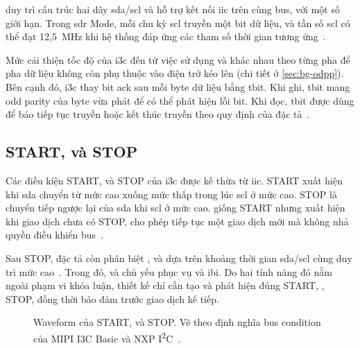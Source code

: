 \MIPIIThreeCBasic{} duy trì cấu trúc hai dây \gls{sda}/\gls{scl} và hỗ trợ kết nối \Target{} \gls{iic} trên cùng bus, với một số giới hạn. Trong \gls{sdr} Mode, mỗi chu kỳ \gls{scl} truyền một bit dữ liệu, và tần số \gls{scl} có thể đạt 12,5~MHz khi hệ thống đáp ứng các tham số thời gian tương ứng~\cite{mipi_i3c_basic}.

Mức cải thiện tốc độ của \gls{i3c} đến từ việc sử dụng \OpenDrain{} và \PushPull{} khác nhau theo từng pha để pha dữ liệu không còn phụ thuộc vào điện trở kéo lên (chi tiết ở \cref{sec:bg-odpp}). Bên cạnh đó, \gls{i3c} thay bit \gls{ack} sau mỗi byte dữ liệu bằng \gls{tbit}. Khi \Controller{} ghi, \gls{tbit} mang odd parity của byte vừa phát để \Target{} có thể phát hiện lỗi bit. Khi \Controller{} đọc, \gls{tbit} được dùng để báo tiếp tục truyền hoặc kết thúc truyền theo quy định của đặc tả~\cite{mipi_i3c_basic}.

\subsection{START, \RepeatedSTART{} và STOP}
\label{sec:bg-conditions}

Các điều kiện START, \RepeatedSTART{} và STOP của \gls{i3c} được kế thừa từ \gls{iic}. START xuất hiện khi \gls{sda} chuyển từ mức cao xuống mức thấp trong lúc \gls{scl} ở mức cao. STOP là chuyển tiếp ngược lại của \gls{sda} khi \gls{scl} ở mức cao. \RepeatedSTART{} giống START nhưng xuất hiện khi giao dịch chưa có STOP, cho phép \Controller{} tiếp tục một giao dịch mới mà không nhả quyền điều khiển bus~\cites{mipi_i3c_basic}{nxp_i2c}.

Sau STOP, đặc tả còn phân biệt \BusFreeCondition{}, \BusAvailableCondition{} và \BusIdleCondition{} dựa trên khoảng thời gian \gls{sda}/\gls{scl} cùng duy trì mức cao~\cite{mipi_i3c_basic}. Trong đó, \BusAvailableCondition{} và \BusIdleCondition{} chủ yếu phục vụ \HotJoin{} và \gls{ibi}. Do hai tính năng đó nằm ngoài phạm vi khóa luận, thiết kế chỉ cần tạo và phát hiện đúng START, \RepeatedSTART{}, STOP, đồng thời bảo đảm \BusFreeCondition{} trước giao dịch kế tiếp.

\begin{figure}[!htbp]
	\centering
	
	\caption[Waveform của START, Repeated START và STOP]{Waveform của START, \RepeatedSTART{} và STOP. Vẽ theo định nghĩa bus condition của MIPI I3C Basic và NXP I\textsuperscript{2}C~\cites{mipi_i3c_basic}{nxp_i2c}.}
	\label{fig:start-sr-stop}
\end{figure}


